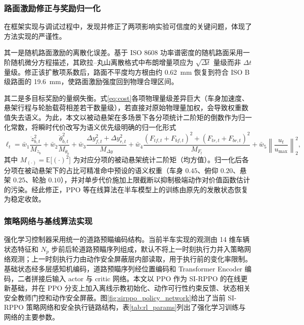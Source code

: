 \subsubsection{路面激励修正与奖励归一化}
在框架实现与调试过程中，发现并修正了两项影响实验可信度的关键问题，体现了方法实现的严谨性。

其一是随机路面激励的离散化误差。基于 ISO 8608 功率谱密度的随机路面采用一阶随机微分方程描述，其欧拉--丸山离散格式中布朗增量项应为 $\sqrt{\Delta t}$ 量级而非 $\Delta t$ 量级。修正该扩散项系数后，路面不平度均方根由约 \SI{0.62}{mm} 恢复到符合 ISO B 级路面的 \SI{19.6}{mm}，使路面激励强度回到物理合理区间。

其二是多目标奖励的量纲失衡。式\eqref{eq:cost}各项物理量级差异巨大（车身加速度、悬架行程与轮胎载荷相差若干数量级），若直接对原始物理量加权，会导致权重数值失去语义。为此，本文以被动悬架在多场景下各分项统计二阶矩的倒数作为归一化常数，将瞬时代价改写为语义优先级明确的归一化形式
\begin{equation}
\ell_t=
\bar w_1\frac{\ddot z_{b,t}^2}{M_{\ddot z_b}}
+\bar w_2\frac{\ddot\theta_{b,t}^2}{M_{\ddot\theta_b}}
+\bar w_3\frac{\Delta y_{f,t}^2+\Delta y_{r,t}^2}{M_{\Delta y}}
+\bar w_4\frac{(F_{tf,t}+F_{bf,t})^2+(F_{tr,t}+F_{br,t})^2}{M_{F_t}}
+\bar w_5\left\|\frac{u_t}{u_{\max}}\right\|_2^2,
\label{eq:stage_cost_norm}
\end{equation}
其中 $M_{(\cdot)}=\mathbb E\big[(\cdot)^2\big]$ 为对应分项的被动悬架统计二阶矩（均方值）。归一化后各分项在被动悬架下的占比可精准命中预设的语义权重（车身 $0.45$、俯仰 $0.20$、悬架 $0.25$、轮胎 $0.10$），并对单步代价施加上限截断以抑制极端动作对价值函数估计的污染。经此修正，PPO 等在线算法在半车模型上的训练由原先的发散状态恢复为稳定收敛。

\subsubsection{策略网络与基线算法实现}
强化学习控制器采用统一的道路预瞄编码结构。当前半车实现的观测由 14 维车辆状态特征和 $N_p$ 步前后轮道路预瞄序列组成，默认不将上一时刻执行力并入策略网络观测；上一时刻执行力由动作安全屏蔽层内部读取，用于执行前的变化率限制。基础状态经多层感知机编码，道路预瞄序列经位置编码和 Transformer Encoder 编码，二者拼接后输入 actor 与 critic 网络。本文以 PPO 作为 SI-RPPO 的在线更新基础，并在 PPO 分支上加入离线示教初始化、动作可行性约束反馈、状态相关安全教师门控和动作安全屏蔽。图\ref{fig:sirppo_policy_network}给出了当前 SI-RPPO 策略网络和安全执行链路结构，表\ref{tab:rl_params}列出了强化学习训练与网络的主要参数。

